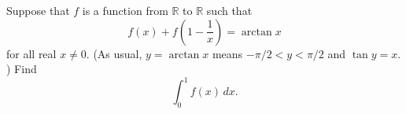 Suppose that $f$ is a function from $\mathbb{R}$ to $\mathbb{R}$ such that
\[f(x)+f\left(1-\frac1x\right)=\arctan x\]for all real $x\ne 0.$ (As usual, $y=\arctan x$ means $-\pi/2<y<\pi/2$ and $\tan y=x.$) Find
\[\int_0^1f(x)\,dx.\]